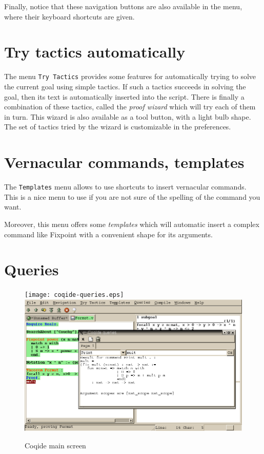 Finally, notice that these navigation buttons are also available in
the menu, where their keyboard shortcuts are given.

\section{Try tactics automatically}

The menu \texttt{Try Tactics} provides some features for automatically
trying to solve the current goal using simple tactics. If such a
tactics succeeds in solving the goal, then its text is automatically
inserted into the script. There is finally a combination of these
tactics, called the \emph{proof wizard} which will try each of them in
turn. This wizard is also available as a tool button, with a light
bulb shape.  The set of tactics tried by the wizard is customizable in
the preferences.

\section{Vernacular commands, templates}

The \texttt{Templates} menu allows to use shortcuts to insert
vernacular commands. This is a nice menu to use if you are not sure of
the spelling of the command you want.

Moreover, this menu offers some \emph{templates} which will automatic
insert a complex command like Fixpoint with a convenient shape for its
arguments. 

\section{Queries}

\begin{figure}[t]
\begin{center}
\ifx\pdfoutput\undefined   %
\texttt{[image: coqide-queries.eps]}
\else
\includegraphics[width=1.0\textwidth]{coqide-queries.png}
\fi
\end{center}
\caption{Coqide main screen}
\label{fig:querywindow}
\end{figure}


